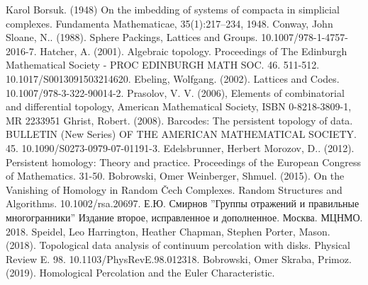 \documentclass[a4paper, 12pt]{article}
\begin{document}
\newpage
{}
\begin{thebibliography}{}
 Karol Borsuk. (1948) On the imbedding of systems of compacta in simplicial complexes. Fundamenta Mathematicae, 35(1):217–234, 1948.
 Conway, John \; Sloane, N.. (1988). Sphere Packings, Lattices and Groups. 10.1007/978-1-4757-2016-7. 
 Hatcher, A. (2001). Algebraic topology. Proceedings of The Edinburgh Mathematical Society - PROC EDINBURGH MATH SOC. 46. 511-512. 10.1017/S0013091503214620. 
 Ebeling, Wolfgang. (2002). Lattices and Codes. 10.1007/978-3-322-90014-2.
  Prasolov, V. V. (2006), Elements of combinatorial and differential topology, American Mathematical Society, ISBN 0-8218-3809-1, MR 2233951
 Ghrist, Robert. (2008). Barcodes: The persistent topology of data. BULLETIN (New Series) OF THE AMERICAN MATHEMATICAL SOCIETY. 45. 10.1090/S0273-0979-07-01191-3. 
 Edelsbrunner, Herbert \; Morozov, D.. (2012). Persistent homology: Theory and practice. Proceedings of the European Congress of Mathematics. 31-50. 
 Bobrowski, Omer \; Weinberger, Shmuel. (2015). On the Vanishing of Homology in Random Čech Complexes. Random Structures and Algorithms. 10.1002/rsa.20697. 
 Е.Ю. Смирнов ”Группы отражений и правильные многогранники” Издание
второе, исправленное и дополненное. Москва. МЦНМО. 2018.
 Speidel, Leo \; Harrington, Heather \; Chapman, Stephen \; Porter, Mason. (2018). Topological data analysis of continuum percolation with disks. Physical Review E. 98. 10.1103/PhysRevE.98.012318. 
 Bobrowski, Omer \; Skraba, Primoz. (2019). Homological Percolation and the Euler Characteristic. 
\end{thebibliography}
\end{document}
